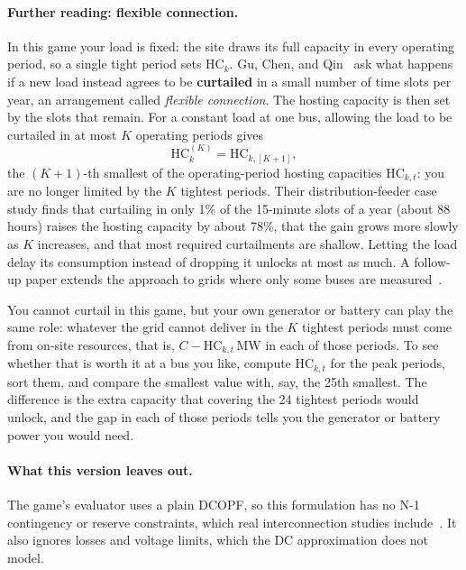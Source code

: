 \documentclass[10pt]{article}
\newcommand{\MW}{\ensuremath{\,\mathrm{MW}}}
\begin{document}
\paragraph{Further reading: flexible connection.} In this game your load is
fixed: the site draws its full capacity in every operating period, so a single tight period
sets $\mathrm{HC}_k$. Gu, Chen, and Qin~\cite{gu2026flexible} ask what happens
if a new load instead agrees to be \textbf{curtailed} in a small number of time slots
per year, an arrangement called \emph{flexible connection}. The hosting
capacity is then set by the slots that remain. For a constant load at one bus,
allowing the load to be curtailed in at most $K$ operating periods gives
\[
  \mathrm{HC}_k^{(K)} = \mathrm{HC}_{k,[K+1]},
\]
the $(K+1)$-th smallest of the operating-period hosting capacities $\mathrm{HC}_{k,t}$:
you are no longer limited by the $K$ tightest periods. Their distribution-feeder
case study finds that curtailing in only 1\% of the 15-minute slots of a year
(about 88 hours) raises the hosting capacity by about 78\%, that the gain grows
more slowly as $K$ increases, and that most required curtailments are shallow.
Letting the load delay its consumption instead of dropping it unlocks at most as
much. A follow-up paper extends the approach to grids where only some buses are
measured~\cite{gu2026partial}.

You cannot curtail in this game, but your own generator or battery can play the
same role: whatever the grid cannot deliver in the $K$ tightest periods must come
from on-site resources, that is, $C - \mathrm{HC}_{k,t}$\MW{} in each of those
periods. To see whether that is worth it at a bus you like, compute
$\mathrm{HC}_{k,t}$ for the peak periods, sort them, and compare the smallest
value with, say, the 25th smallest. The difference is the extra capacity that
covering the 24 tightest periods would unlock, and the gap in each of those periods
tells you the generator or battery power you would need.

\paragraph{What this version leaves out.} The game's evaluator uses a plain
DCOPF, so this formulation has no N-1 contingency or reserve constraints, which
real interconnection studies include~\cite{wan2026hosting}. It also ignores
losses and voltage limits, which the DC approximation does not model.
\end{document}
